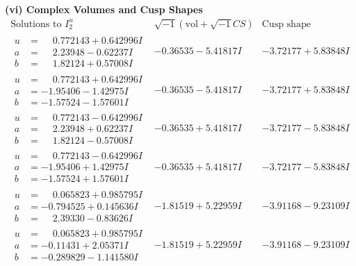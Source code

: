 \documentclass[1p]{elsarticle_modified}
\theoremstyle{definition}
\newcommand{\I}{\sqrt{-1}}
\begin{document}
\newpage\flushleft \textbf{(vi) Complex Volumes and Cusp Shapes}
$$\begin{array}{c|c|c}  
\text{Solutions to }I^u_{2}& \I (\text{vol} + \sqrt{-1}CS) & \text{Cusp shape}\\
 \hline 
\begin{aligned}
u &= \phantom{-}0.772143 + 0.642996 I \\
a &= \phantom{-}2.23948 - 0.62237 I \\
b &= \phantom{-}1.82124 + 0.57008 I\end{aligned}
 & -0.36535 - 5.41817 I & -3.72177 + 5.83848 I \\ \hline\begin{aligned}
u &= \phantom{-}0.772143 + 0.642996 I \\
a &= -1.95406 - 1.42975 I \\
b &= -1.57524 - 1.57601 I\end{aligned}
 & -0.36535 - 5.41817 I & -3.72177 + 5.83848 I \\ \hline\begin{aligned}
u &= \phantom{-}0.772143 - 0.642996 I \\
a &= \phantom{-}2.23948 + 0.62237 I \\
b &= \phantom{-}1.82124 - 0.57008 I\end{aligned}
 & -0.36535 + 5.41817 I & -3.72177 - 5.83848 I \\ \hline\begin{aligned}
u &= \phantom{-}0.772143 - 0.642996 I \\
a &= -1.95406 + 1.42975 I \\
b &= -1.57524 + 1.57601 I\end{aligned}
 & -0.36535 + 5.41817 I & -3.72177 - 5.83848 I \\ \hline\begin{aligned}
u &= \phantom{-}0.065823 + 0.985795 I \\
a &= -0.794525 + 0.145636 I \\
b &= \phantom{-}2.39330 - 0.83626 I\end{aligned}
 & -1.81519 + 5.22959 I & -3.91168 - 9.23109 I \\ \hline\begin{aligned}
u &= \phantom{-}0.065823 + 0.985795 I \\
a &= -0.11431 + 2.05371 I \\
b &= -0.289829 - 1.141580 I\end{aligned}
 & -1.81519 + 5.22959 I & -3.91168 - 9.23109 I \\ \hline\begin{aligned}

\end{aligned}
\end{array}$$
\end{document}
